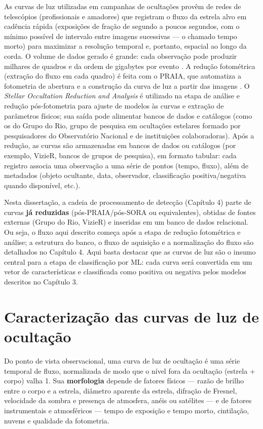 As curvas de luz utilizadas em campanhas de ocultações provêm de redes de telescópios (profissionais e amadores) que registram o fluxo da estrela alvo em cadência rápida (exposições de fração de segundo a poucos segundos, com o mínimo possível de intervalo entre imagens sucessivas --- o chamado tempo morto) para maximizar a resolução temporal e, portanto, espacial ao longo da corda. O volume de dados gerado é grande: cada observação pode produzir milhares de quadros e da ordem de gigabytes por evento \citep{Cazeneuve2023}. A redução fotométrica (extração do fluxo em cada quadro) é feita com o PRAIA, que automatiza a fotometria de abertura e a construção da curva de luz a partir das imagens \citep{Assafin2023}. O \textit{Stellar Occultation Reduction and Analysis} \citep[SORA,][]{SORA2022} é utilizado na etapa de análise e redução pós-fotometria para ajuste de modelos às curvas e extração de parâmetros físicos; sua saída pode alimentar bancos de dados e catálogos (como os do Grupo do Rio, grupo de pesquisa em ocultações estelares formado por pesquisadores do Observatório Nacional e de instituições colaboradoras). Após a redução, as curvas são armazenadas em bancos de dados ou catálogos (por exemplo, VizieR, bancos de grupos de pesquisa), em formato tabular: cada registro associa uma observação a uma série de pontos (tempo, fluxo), além de metadados (objeto ocultante, data, observador, classificação positiva/negativa quando disponível, etc.).

Nesta dissertação, a cadeia de processamento de detecção (Capítulo 4) parte de curvas \textbf{já reduzidas} (pós-PRAIA/pós-SORA ou equivalentes), obtidas de fontes externas (Grupo do Rio, VizieR) e inseridas em um banco de dados relacional. Ou seja, o fluxo aqui descrito começa após a etapa de redução fotométrica e análise; a estrutura do banco, o fluxo de aquisição e a normalização do fluxo são detalhados no Capítulo 4. Aqui basta destacar que as curvas de luz são o insumo central para a etapa de classificação por ML: cada curva será convertida em um vetor de características e classificada como positiva ou negativa pelos modelos descritos no Capítulo 3.

\section{Caracterização das curvas de luz de ocultação}
\label{sec:caracteristicas_curvas}

Do ponto de vista observacional, uma curva de luz de ocultação é uma série temporal de fluxo, normalizada de modo que o nível fora da ocultação (estrela + corpo) valha 1. Sua \textbf{morfologia} depende de fatores físicos --- razão de brilho entre o corpo e a estrela, diâmetro aparente da estrela, difração de Fresnel, velocidade da sombra e presença de atmosfera, anéis ou satélites --- e de fatores instrumentais e atmosféricos --- tempo de exposição e tempo morto, cintilação, nuvens e qualidade da fotometria.


